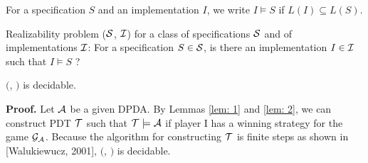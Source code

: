 %

\medskip\par
For a specification $S$ and an implementation $I$,
we write $I \models S$ if $L(I) \subseteq L(S)$.

\begin{definition}
Realizability problem \Real (${\cal S}$, ${\cal I}$) for a class of specifications ${\cal S}$ and of implementations ${\cal I}$: For a specification $S\in{\cal S}$, is there an implementation $I\in{\cal I}$ such that $I \models S$ ?
\end{definition}

\begin{theorem}\label{the: DPDA}
\Real $($\DPDA, \PDT$)$ is decidable.
\end{theorem}
{\bf Proof.}\quad
Let ${\cal A}$ be a given DPDA.
By Lemmas \ref{lem: 1} and \ref{lem: 2},
we can construct PDT ${\cal T}$ such that ${\cal T}\models{\cal A}$ if player I has a winning strategy for the game ${\cal G}_{\cal A}$.
Because the algorithm for constructing ${\cal T}$ is finite steps
as shown in [Walukiewucz, 2001], \Real $($\DPDA, \PDT$)$ is decidable.

